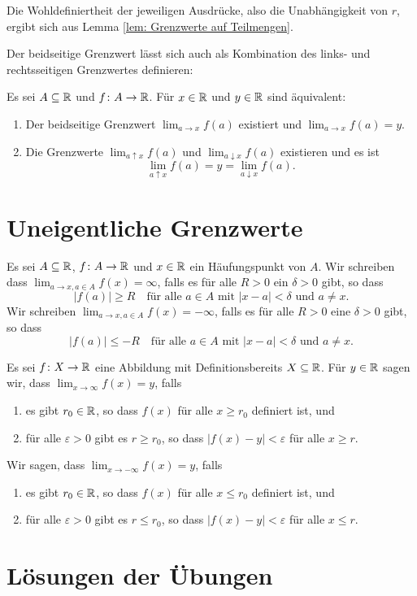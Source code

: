 \documentclass[a4paper,10pt]{article}
\begin{document}
Die Wohldefiniertheit der jeweiligen Ausdrücke, also die Unabhängigkeit von $r$, ergibt sich aus Lemma \ref{lem: Grenzwerte auf Teilmengen}.


Der beidseitige Grenzwert lässt sich auch als Kombination des links- und rechtsseitigen Grenzwertes definieren:


\begin{lem}
 Es sei $A \subseteq \mathbb{R}$ und $f \colon A \to \mathbb{R}$. Für $x \in \mathbb{R}$ und $y \in \mathbb{R}$ sind äquivalent:
 \begin{enumerate}
  \item
   Der beidseitige Grenzwert $\lim_{a \to x} f(a)$ existiert und $\lim_{a \to x} f(a) = y$.
  \item
   Die Grenzwerte $\lim_{a \uparrow x} f(a)$ und $\lim_{a \downarrow x} f(a)$ existieren und es ist
   \[
    \lim_{a \uparrow x} f(a) = y = \lim_{a \downarrow x} f(a).
   \]
 \end{enumerate}
\end{lem}





\section{Uneigentliche Grenzwerte}


\begin{defi}
 Es sei $A \subseteq \mathbb{R}$, $f \colon A \to \mathbb{R}$ und $x \in \mathbb{R}$ ein Häufungspunkt von $A$. Wir schreiben dass $\lim_{a \to x, a \in A} f(x) = \infty$, falls es für alle $R > 0$ ein $\delta > 0$ gibt, so dass
 \[
  |f(a)| \geq R \quad \text{für alle $a \in A$ mit $|x-a| < \delta$ und $a \neq x$}.
 \]
 Wir schreiben $\lim_{a \to x, a \in A} f(x) = -\infty$, falls es für alle $R > 0$ eine $\delta > 0$ gibt, so dass
 \[
  |f(a)| \leq -R \quad \text{für alle $a \in A$ mit $|x-a| < \delta$ und $a \neq x$}.
 \]
\end{defi}




\begin{defi}
 Es sei $f \colon X \to \mathbb{R}$ eine Abbildung mit Definitionsbereits $X \subseteq \mathbb{R}$. Für $y \in \mathbb{R}$ sagen wir, dass $\lim_{x \to \infty} f(x) = y$, falls
 \begin{enumerate}
  \item
   es gibt $r_0 \in \mathbb{R}$, so dass $f(x)$ für alle $x \geq r_0$ definiert ist, und
  \item
   für alle $\varepsilon > 0$ gibt es $r \geq r_0$, so dass $|f(x) - y| < \varepsilon$ für alle $x \geq r$.
 \end{enumerate}
 Wir sagen, dass $\lim_{x \to -\infty} f(x) = y$, falls
 \begin{enumerate}
  \item
   es gibt $r_0 \in \mathbb{R}$, so dass $f(x)$ für alle $x \leq r_0$ definiert ist, und
  \item
   für alle $\varepsilon > 0$ gibt es $r \leq r_0$, so dass $|f(x) - y| < \varepsilon$ für alle $x \leq r$.
 \end{enumerate}
\end{defi}









\newpage


\section{Lösungen der Übungen}


\printsolutions
\end{document}
